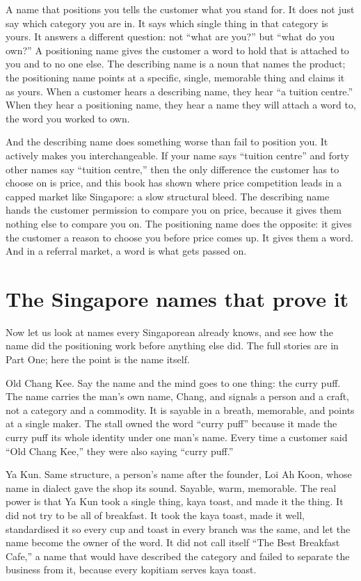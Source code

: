 \documentclass[10pt,twoside,openany]{memoir}
\newcommand{\needspacehead}{\needspace{4\baselineskip}}
\let\oldsection\section
\renewcommand{\section}{\needspacehead\oldsection}
\begin{document}
{A name that positions you tells the customer what you stand for. It does
not just say which category you are in. It says which single thing in
that category is yours. It answers a different question: not ``what are
you?'' but ``what do you own?'' A positioning name gives the customer a
word to hold that is attached to you and to no one else. The describing
name is a noun that names the product; the positioning name points at a
specific, single, memorable thing and claims it as yours. When a
customer hears a describing name, they hear ``a tuition centre.'' When
they hear a positioning name, they hear a name they will attach a word
to, the word you worked to own.

And the describing name does something worse than fail to position you.
It actively makes you interchangeable. If your name says ``tuition
centre'' and forty other names say ``tuition centre,'' then the only
difference the customer has to choose on is price, and this book has
shown where price competition leads in a capped market like Singapore: a
slow structural bleed. The describing name hands the customer permission
to compare you on price, because it gives them nothing else to compare
you on. The positioning name does the opposite: it gives the customer a
reason to choose you before price comes up. It gives them a word. And in
a referral market, a word is what gets passed on.

\section{The Singapore names that prove
it}\label{the-singapore-names-that-prove-it}

Now let us look at names every Singaporean already knows, and see how
the name did the positioning work before anything else did. The full
stories are in Part One; here the point is the name itself.

Old Chang Kee. Say the name and the mind goes to one thing: the curry
puff. The name carries the man's own name, Chang, and signals a person
and a craft, not a category and a commodity. It is sayable in a breath,
memorable, and points at a single maker. The stall owned the word
``curry puff'' because it made the curry puff its whole identity under
one man's name. Every time a customer said ``Old Chang Kee,'' they were
also saying ``curry puff.''

Ya Kun. Same structure, a person's name after the founder, Loi Ah Koon,
whose name in dialect gave the shop its sound. Sayable, warm, memorable.
The real power is that Ya Kun took a single thing, kaya toast, and made
it the thing. It did not try to be all of breakfast. It took the kaya
toast, made it well, standardised it so every cup and toast in every
branch was the same, and let the name become the owner of the word. It
did not call itself ``The Best Breakfast Cafe,'' a name that would have
described the category and failed to separate the business from it,
because every kopitiam serves kaya toast.

}
\end{document}

